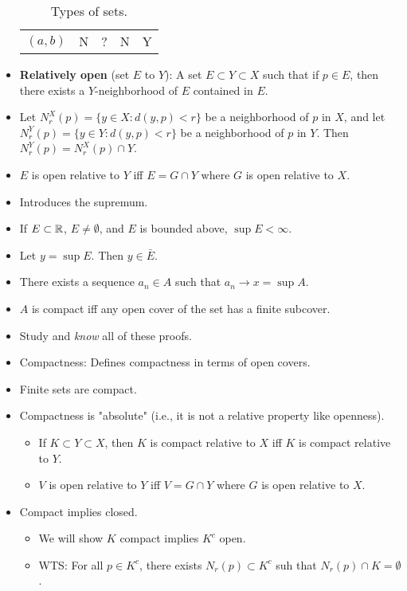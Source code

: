 \documentclass[../../notes.tex]{subfiles}
\begin{document}
\begin{itemize}
\begin{table}[h!]
\begin{tabular}{l|c|c|c|c}
            $(a,b)$ & N & ? & N & Y\\
        \end{tabular}
        \caption{Types of sets.}
        \label{tab:typesSets}
    \end{table}
    \item \textbf{Relatively open} (set $E$ to $Y$): A set $E\subset Y\subset X$ such that if $p\in E$, then there exists a $Y$-neighborhood of $E$ contained in $E$.
    \item Let $N_r^X(p)=\{y\in X:d(y,p)<r\}$ be a neighborhood of $p$ in $X$, and let $N_r^Y(p)=\{y\in Y:d(y,p)<r\}$ be a neighborhood of $p$ in $Y$. Then $N_r^Y(p)=N_r^X(p)\cap Y$.
    \item $E$ is open relative to $Y$ iff $E=G\cap Y$ where $G$ is open relative to $X$.
    \item Introduces the supremum.
    \item If $E\subset\mathbb{R}$, $E\neq\emptyset$, and $E$ is bounded above, $\sup E<\infty$.
    \item Let $y=\sup E$. Then $y\in\bar{E}$.
    \item There exists a sequence $a_n\in A$ such that $a_n\to x=\sup A$.
    \item $A$ is compact iff any open cover of the set has a finite subcover.
    \item Study and \emph{know} all of these proofs.
    \item {}Compactness: Defines compactness in terms of open covers.
    \item Finite sets are compact.
    \item Compactness is "absolute" (i.e., it is not a relative property like openness).
    \begin{itemize}
        \item If $K\subset Y\subset X$, then $K$ is compact relative to $X$ iff $K$ is compact relative to $Y$.
        \item $V$ is open relative to $Y$ iff $V=G\cap Y$ where $G$ is open relative to $X$.
    \end{itemize}
    \item Compact implies closed.
    \begin{itemize}
        \item We will show $K$ compact implies $K^c$ open.
        \item WTS: For all $p\in K^c$, there exists $N_r(p)\subset K^c$ suh that $N_r(p)\cap K=\emptyset$.
    \end{itemize}

\end{itemize}
\end{document}
